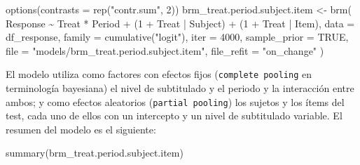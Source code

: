 \documentclass[
  12pt,
  a4paper,
  extrafontsizes,
  onecolumn,
  openright,
  table]{memoir}
\newenvironment{Shaded}{\begin{snugshade}}{\end{snugshade}}
\newcommand{\AttributeTok}[1]{\textcolor[rgb]{0.40,0.45,0.13}{#1}}
\newcommand{\ConstantTok}[1]{\textcolor[rgb]{0.56,0.35,0.01}{#1}}
\newcommand{\DecValTok}[1]{\textcolor[rgb]{0.68,0.00,0.00}{#1}}
\newcommand{\FunctionTok}[1]{\textcolor[rgb]{0.28,0.35,0.67}{#1}}
\newcommand{\NormalTok}[1]{\textcolor[rgb]{0.00,0.23,0.31}{#1}}
\newcommand{\OtherTok}[1]{\textcolor[rgb]{0.00,0.23,0.31}{#1}}
\newcommand{\SpecialCharTok}[1]{\textcolor[rgb]{0.37,0.37,0.37}{#1}}
\newcommand{\StringTok}[1]{\textcolor[rgb]{0.13,0.47,0.30}{#1}}
\begin{document}
\begin{Shaded}
\begin{Highlighting}[]
\FunctionTok{options}\NormalTok{(}\AttributeTok{contrasts =} \FunctionTok{rep}\NormalTok{(}\StringTok{"contr.sum"}\NormalTok{, }\DecValTok{2}\NormalTok{))}
\NormalTok{brm\_treat.period.subject.item }\OtherTok{\textless{}{-}} \FunctionTok{brm}\NormalTok{(}
\NormalTok{    Response }\SpecialCharTok{\textasciitilde{}}\NormalTok{ Treat }\SpecialCharTok{*}\NormalTok{ Period }\SpecialCharTok{+}\NormalTok{ (}\DecValTok{1} \SpecialCharTok{+}\NormalTok{ Treat }\SpecialCharTok{|}\NormalTok{ Subject) }\SpecialCharTok{+}\NormalTok{ (}\DecValTok{1} \SpecialCharTok{+}\NormalTok{ Treat }\SpecialCharTok{|}\NormalTok{ Item),}
    \AttributeTok{data =}\NormalTok{ df\_response,}
    \AttributeTok{family =} \FunctionTok{cumulative}\NormalTok{(}\StringTok{"logit"}\NormalTok{),}
    \AttributeTok{iter =} \DecValTok{4000}\NormalTok{,}
    \AttributeTok{sample\_prior =} \ConstantTok{TRUE}\NormalTok{,}
    \AttributeTok{file =} \StringTok{"models/brm\_treat.period.subject.item"}\NormalTok{,}
    \AttributeTok{file\_refit =} \StringTok{"on\_change"}
\NormalTok{)}
\end{Highlighting}
\end{Shaded}

\normalsize

El modelo utiliza como factores con efectos fijos
(\texttt{complete\ pooling} en terminología bayesiana) el nivel de
subtitulado y el periodo y la interacción entre ambos; y como efectos
aleatorios (\texttt{partial\ pooling}) los sujetos y los ítems del test,
cada uno de ellos con un intercepto y un nivel de subtitulado variable.
El resumen del modelo es el siguiente:

\tiny

\begin{Shaded}
\begin{Highlighting}[]
\FunctionTok{summary}\NormalTok{(brm\_treat.period.subject.item)}
\end{Highlighting}
\end{Shaded}
\end{document}
